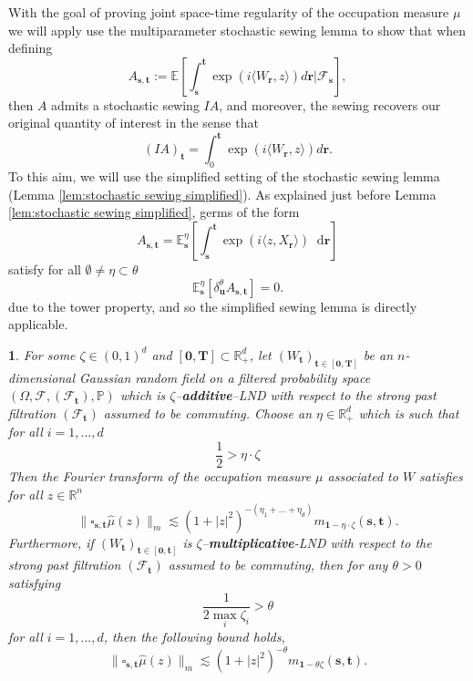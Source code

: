 \documentclass[11pt,oneside,english,reqno]{amsart}
\numberwithin{equation}{section}
\numberwithin{figure}{section}
\theoremstyle{plain}
\newtheorem{thm}{\protect\theoremname}
\theoremstyle{definition}
\theoremstyle{remark}
\theoremstyle{plain}
\theoremstyle{plain}
\theoremstyle{plain}
\theoremstyle{plain}
\theoremstyle{plain}
\providecommand{\theoremname}{Theorem}
\newcommand{\cF}{\mathcal{F}}
\newcommand{\EE}{\mathbb{E}}
\newcommand{\PP}{\mathbb{P}}
\newcommand{\RR}{\mathbb{R}}
\newcommand{\br}{\mathbf{r}}
\newcommand{\bT}{\mathbf{T}}
\newcommand{\bu}{\mathbf{u}}
\newcommand{\bs}{\mathbf{s}}
\newcommand{\bt}{\mathbf{t}}
\newcommand{\dd}{\mathop{}\!\mathrm{d}}
\begin{document}
\noindent
With the goal of proving joint space-time regularity of the occupation measure $\mu$ we will apply use the multiparameter stochastic sewing lemma to show that when defining  
\[
A_{\bs, \bt}:=\mathbb{E}[\int_{\bs}^{\bt} \exp(i\langle W_{\br}, z\rangle)d\br|\mathcal{F}_\bs], 
\]
then  $A$ admits a stochastic sewing $IA$,  and moreover, the sewing recovers our original quantity of interest in the sense that
\[
(IA)_\bt=\int_0^\bt \exp(i\langle W_\br, z\rangle)d\br. 
\]
%
To this aim, we will use the  simplified setting of the stochastic sewing lemma (Lemma \ref{lem:stochastic sewing simplified}). As explained just before Lemma \ref{lem:stochastic sewing simplified}, germs of the form
    \[
    A_{\bs,\bt}=\EE^\eta_{\bs}\left[ \int_\bs^{\bt} \exp(i\langle z,X_{\br}\rangle ) \dd \br \right]
    \]
  satisfy for all $\emptyset\neq\eta\subset \theta$
   \begin{equation*}
       \EE^\eta_{\bs}\left[ \delta^\theta_\bu A_{\bs,\bt}  \right]=0.
   \end{equation*}
due to the tower property, and so the simplified sewing lemma is directly applicable. 



\begin{thm}\label{thm:bound moment fourier}
For some $\zeta\in (0,1)^d$ and $[\mathbf{0},\bT]\subset \RR_+^d$,  let $(W_\bt)_{\bt\in [\mathbf{0},\bT]}$ be an $n$-dimensional Gaussian random field on a filtered probability space $(\Omega,\cF,(\cF_{\bt}),\PP) $ which is $\zeta$--{\bf additive}--LND with respect to the strong past filtration $(\mathcal{F}_\bt)$ assumed to be commuting. 
Choose an $\eta\in \RR_+^d$ which is such that for all $i=1,...,d$
\begin{equation}
   \frac{1}{2}>\eta\cdot \zeta
\end{equation}
Then the Fourier transform of the occupation measure $\mu$ associated to $W$ satisfies for all $z\in \RR^n$
\begin{equation}
       \label{eq:additive stochastic bound}\|\square_{\bs,\bt}\hat{\mu} (z)\|_{m}\lesssim (1+|z|^2)^{-(\eta_1+...+\eta_d)} m_{\mathbf{1}-\eta\cdot \zeta}(\bs,\bt). 
\end{equation}
Furthermore, if $(W_\bt)_{\bt\in [\mathbf{0},\bt]}$ is $\zeta$--{\bf multiplicative}-LND with respect to the strong past filtration $(\mathcal{F}_\bt)$ assumed to be commuting, then for any $\theta>0$ satisfying 
\[
 \frac{1}{2 \max_i \zeta_i}>\theta
\]
for all $i=1,...,d$, 
then the following bound holds, 
\begin{equation}\label{eq:multiplicative stochastic bound}
\|\square_{\bs,\bt}\hat{\mu} (z)\|_{m}\lesssim (1+|z|^2)^{-\theta} m_{\mathbf{1}-\theta\zeta}(\bs,\bt). 
\end{equation}
\end{thm}
\end{document}

